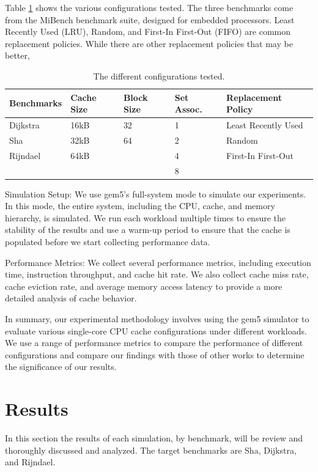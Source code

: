 \documentclass[conference]{IEEEtran}
\begin{document}
Table \ref{table:configurations} shows the various configurations tested. The three benchmarks come from the MiBench benchmark suite, designed for embedded processors\cite{990739}. Least Recently Used (LRU), Random, and First-In First-Out (FIFO) are common replacement policies. While there are other replacement policies that may be better, 

\begin{table}[H]
  \centering
  \begin{tabular}{| m{1.6cm} | m{.75cm} | m{.75cm} | m{.8cm} | m{2.6cm} |}
      \hline
      \textbf{Benchmarks} & \textbf{Cache Size} & \textbf{Block Size}& \textbf{Set Assoc.}& \textbf{Replacement Policy} \\ \hline
      Dijkstra    &   16kB  &   32    &  1   &    Least Recently Used     \\ \hline
      Sha         &   32kB  &   64    &  2   &    Random                  \\ \hline
      Rijndael    &   64kB  &         &  4   &    First-In First-Out      \\ \hline
                  &         &         &  8   &                            \\ \hline
  \end{tabular}
  \caption{The different configurations tested.}
  \label{table:configurations}
\end{table}

Simulation Setup:
We use gem5's full-system mode to simulate our experiments. In this mode, the entire system, including the CPU, cache, and memory hierarchy, is simulated. We run each workload multiple times to ensure the stability of the results and use a warm-up period to ensure that the cache is populated before we start collecting performance data.

Performance Metrics:
We collect several performance metrics, including execution time, instruction throughput, and cache hit rate. We also collect cache miss rate, cache eviction rate, and average memory access latency to provide a more detailed analysis of cache behavior.

In summary, our experimental methodology involves using the gem5 simulator to evaluate various single-core CPU cache configurations under different workloads. We use a range of performance metrics to compare the performance of different configurations and compare our findings with those of other works to determine the significance of our results.

\section{Results}
In this section the results of each simulation, by benchmark, will be review and thoroughly discussed and analyzed. The target benchmarks are Sha, Dijkstra, and Rijndael.
\end{document}
